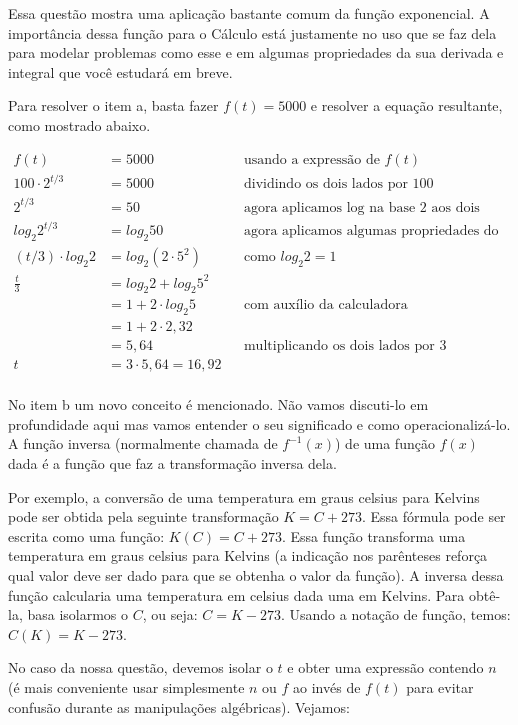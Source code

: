 \documentclass[main.tex]{subfiles}
\begin{document}
Essa questão mostra uma aplicação bastante comum da função exponencial. A importância dessa função para o Cálculo está justamente no uso que se faz dela para modelar problemas como esse e em algumas propriedades da sua derivada e integral que você estudará em breve.

Para resolver o item a, basta fazer $f(t)=5000$ e resolver a equação resultante, como mostrado abaixo.

\begin{align*}
f(t) & {} =5000 && \text{usando a expressão de } f(t)\\
100 \cdot 2^{t/3} & {} = 5000  && \text{dividindo os dois lados por 100}\\
2^{t/3} & {} = 50 && \text{agora aplicamos log na base 2 aos dois lados da igualdade} \\
log_2 2^{t/3} & {} = log_2 50 && \text{agora aplicamos algumas propriedades do log} \\
(t/3) \cdot log_2 2 & {} = log_2 (2 \cdot 5^2)  && \text{como } log_2 2=1\\
 \frac{t}{3} & = log_2 2 + log_2 5^2 \\
 & = 1 + 2 \cdot log_2 5 && \text{com auxílio da calculadora} \\
 & = 1 + 2 \cdot 2,32 \\
 & = 5,64 && \text{multiplicando os dois lados por 3}\\
t & {} = 3 \cdot 5,64 = 16,92 \\
\end{align*}

No item b um novo conceito é mencionado. Não vamos discuti-lo em profundidade aqui mas vamos entender o seu significado e como operacionalizá-lo. A função inversa (normalmente chamada de $f^{-1}(x)$) de uma função $f(x)$ dada é a função que faz a transformação inversa dela.

Por exemplo, a conversão de uma temperatura em graus celsius para Kelvins pode ser obtida pela seguinte transformação $K=C+273$. Essa fórmula pode ser escrita como uma função: $K(C)=C+273$. Essa função transforma uma temperatura em graus celsius para Kelvins (a indicação nos parênteses reforça qual valor deve ser dado para que se obtenha o valor da função). A inversa dessa função calcularia uma temperatura em celsius dada uma em Kelvins. Para obtê-la, basa isolarmos o $C$, ou seja: $C=K-273$. Usando a notação de função, temos: $C(K)=K-273$.

No caso da nossa questão, devemos isolar o $t$ e obter uma expressão contendo $n$ (é mais conveniente usar simplesmente $n$ ou $f$ ao invés de $f(t)$ para evitar confusão durante as manipulações algébricas). Vejamos:
\end{document}
